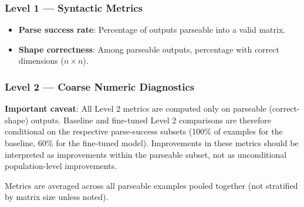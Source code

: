\subsubsection{Level 1 --- Syntactic Metrics}

\begin{itemize}
    \item \textbf{Parse success rate}: Percentage of outputs parseable into a valid matrix.
    \item \textbf{Shape correctness}: Among parseable outputs, percentage with correct dimensions ($n \times n$).
\end{itemize}

\subsubsection{Level 2 --- Coarse Numeric Diagnostics}

\textbf{Important caveat}: All Level 2 metrics are computed only on parseable (correct-shape) outputs. Baseline and fine-tuned Level 2 comparisons are therefore conditional on the respective parse-success subsets (100\% of examples for the baseline, 60\% for the fine-tuned model). Improvements in these metrics should be interpreted as improvements within the parseable subset, not as unconditional population-level improvements.

Metrics are averaged across all parseable examples pooled together (not stratified by matrix size unless noted).

